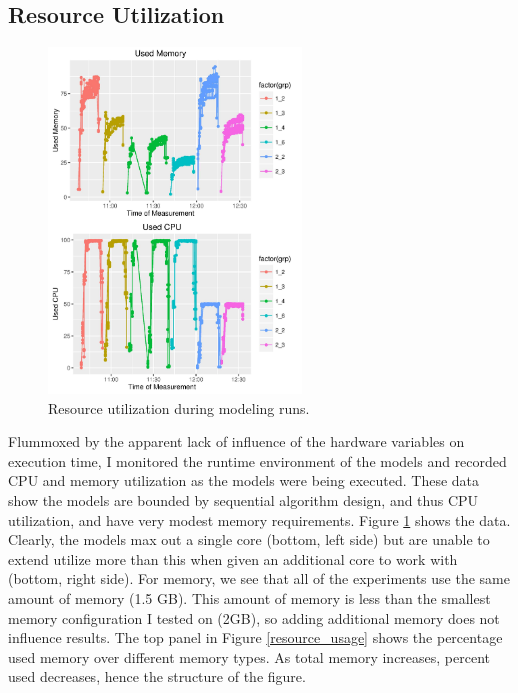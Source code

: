 \documentclass[a4paper]{article}
\begin{document}
\subsection{Resource Utilization}
\begin{figure}
\begin{centering}
\includegraphics[width=0.6\textwidth]{resource-usage.jpg}
\caption{Resource utilization during modeling runs.}\label{fig:resource_usage}
\end{centering}
\end{figure}
Flummoxed by the apparent lack of influence of the hardware variables on execution time, I monitored the runtime environment of the models and recorded CPU and memory utilization as the models were being executed.  These data show the models are bounded by sequential algorithm design, and thus CPU utilization, and have very modest memory requirements. Figure \ref{fig:resource_usage} shows the data.  Clearly, the models max out a single core (bottom, left side) but are unable to extend utilize more than this when given an additional core to work with (bottom, right side).  For memory, we see that all of the experiments use the same amount of memory (1.5 GB).  This amount of memory is less than the smallest memory configuration I tested on (2GB), so adding additional memory does not influence results.  The top panel in Figure \ref{resource_usage} shows the percentage used memory over different memory types.  As total memory increases, percent used decreases, hence the structure of the figure. 
\end{document}
